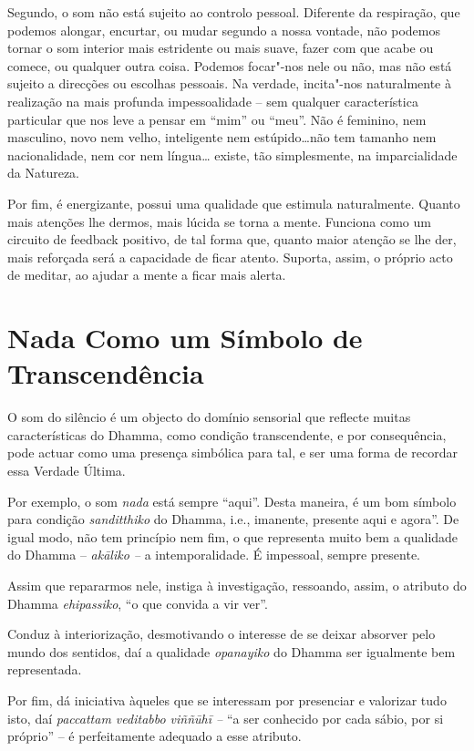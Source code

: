 Segundo, o som não está sujeito ao controlo pessoal. Diferente da
respiração, que podemos alongar, encurtar, ou mudar segundo a nossa
vontade, não podemos tornar o som interior mais estridente ou mais
suave, fazer com que acabe ou comece, ou qualquer outra coisa. Podemos
focar"-nos nele ou não, mas não está sujeito a direcções ou escolhas
pessoais. Na verdade, incita"-nos naturalmente à realização na mais
profunda impessoalidade -- sem qualquer característica particular que
nos leve a pensar em ``mim'' ou ``meu''. Não é feminino, nem masculino,
novo nem velho, inteligente nem estúpido\ldots{}não tem tamanho nem
nacionalidade, nem cor nem língua\ldots{} existe, tão simplesmente, na
imparcialidade da Natureza.

Por fim, é energizante, possui uma qualidade que estimula naturalmente.
Quanto mais atenções lhe dermos, mais lúcida se torna a mente. Funciona
como um circuito de feedback positivo, de tal forma que, quanto maior
atenção se lhe der, mais reforçada será a capacidade de ficar atento.
Suporta, assim, o próprio acto de meditar, ao ajudar a mente a ficar
mais alerta.

\section{Nada Como um Símbolo de Transcendência}

O som do silêncio é um objecto do domínio sensorial que reflecte muitas
características do Dhamma, como condição transcendente, e por
consequência, pode actuar como uma presença simbólica para tal, e ser
uma forma de recordar essa Verdade Última.

Por exemplo, o som \emph{nada} está sempre ``aqui''. Desta maneira, é um
bom símbolo para condição \emph{sanditthiko} do Dhamma, i.e., imanente,
presente aqui e agora''. De igual modo, não tem princípio nem fim, o que
representa muito bem a qualidade do Dhamma -- \emph{akāliko --} a
intemporalidade. É impessoal, sempre presente.

Assim que repararmos nele, instiga à investigação, ressoando, assim, o
atributo do Dhamma \emph{ehipassiko}, ``o que convida a vir ver''.

Conduz à interiorização, desmotivando o interesse de se deixar absorver
pelo mundo dos sentidos, daí a qualidade \emph{opanayiko} do Dhamma ser
igualmente bem representada.

Por fim, dá iniciativa àqueles que se interessam por presenciar e
valorizar tudo isto, daí \emph{paccattam veditabbo viññūhī --} ``a ser
conhecido por cada sábio, por si próprio'' -- é perfeitamente adequado a
esse atributo.

